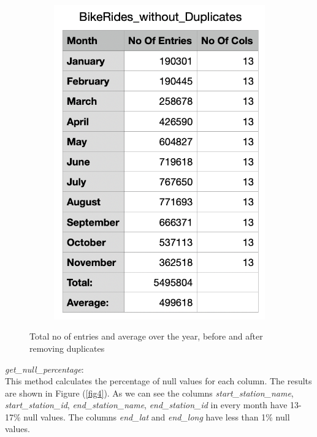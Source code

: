 \documentclass[12pt]{article}
\begin{document}
\begin{figure}[h]
\begin{subfigure}{.4\textwidth}
		\includegraphics[scale=0.5]{img3.png}
		\caption{}
		\label{fig3_2}
	\end{subfigure}
	\caption{Total no of entries and average over the year, before and after removing duplicates}
	\label{fig3}
	\end{figure}

	\textit{get\_null\_percentage}:\\
	This method calculates the percentage of null values for each column. The results are shown in Figure (\ref{fig4}). As we can see the columns \textit{start\_station\_name}, \textit{start\_station\_id}, \textit{end\_station\_name}, \textit{end\_station\_id} in every month have 13-17\% null values. The columns \textit{end\_lat} and \textit{end\_long} have less than 1\% null values. \\
	
\end{document}
